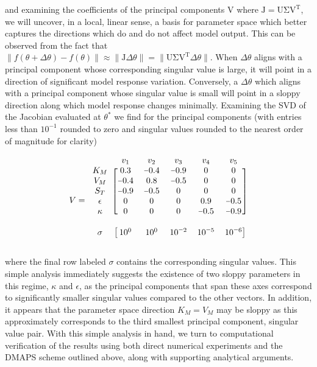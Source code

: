 and examining the coefficients of the principal components
$\mathrm{V}$ where $\mathrm{J} = \mathrm{U \Sigma V^T}$, we will
uncover, in a local, linear sense, a basis for parameter space which
better captures the directions which do and do not affect model
output. This can be observed from the fact that
$\| f(\theta + \Delta \theta) - f(\theta) \| \approx \| \mathrm{J}
\Delta \theta \| = \| \mathrm{U \Sigma V^T} \Delta \theta
\|$. When $\Delta \theta$ aligns with a principal component whose
corresponding singular value is large, it will point in a direction of
significant model response variation. Conversely, a
$\Delta \theta$ which aligns with a principal component whose
singular value is small will point in a sloppy direction along which
model response changes minimally. Examining the SVD of the Jacobian
evaluated at $\theta^*$ we find for the principal components (with
entries less than $10^{-1}$ rounded to zero and singular values
rounded to the nearest order of magnitude for clarity)

\[
  V = \begin{blockarray}{cccccc} & v_1 & v_2 & v_3 & v_4 & v_5
    \\ \begin{block}{c[ccccc]} K_M & 0.3 & \minus 0.4 & \minus 0.9 & 0
      & 0 \\ V_M & \minus 0.4 & 0.8 & \minus 0.5 & 0 & 0 \\ S_T &
      \minus 0.9 & \minus 0.5 & 0 & 0 & 0 \\ \epsilon & 0 & 0 & 0 &
      0.9 & \minus 0.5 \\ \kappa & 0 & 0 & 0 & \minus 0.5 & \minus 0.9
      \\ \end{block} & & & & & \\ \begin{block}{c[ccccc]} \sigma &
      10^0 & 10^0 & 10^{\minus 2} & 10^{\minus 5} & 10^{\minus 6}
      \\ \end{block} \end{blockarray}
\]

where the final row labeled $\sigma$ contains the corresponding
singular values. This simple analysis immediately suggests the
existence of two sloppy parameters in this regime, $\kappa$ and
$\epsilon$, as the principal components that span these axes
correspond to significantly smaller singular values compared to the
other vectors. In addition, it appears that the parameter space
direction $K_M = V_M$ may be sloppy as this approximately corresponds
to the third smallest principal component, singular value pair. With
this simple analysis in hand, we turn to computational verification of
the results using both direct numerical experiments and the DMAPS
scheme outlined above, along with supporting analytical arguments.

